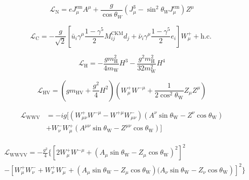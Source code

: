 \begin{equation}\label{eq:1-3}
    \mathcal{L}_{\mathrm{N}}=e J_{\mu}^{\mathrm{em}} A^{\mu}+\frac{g}{\cos \theta_{W}}\left(J_{\mu}^{3}-\sin ^{2} \theta_{W} J_{\mu}^{\mathrm{em}}\right) Z^{\mu}
\end{equation}

\begin{equation}\label{eq:1-4}
    \mathcal{L}_{\mathrm{C}}=-\frac{g}{\sqrt{2}}\left[\bar{u}_{i} \gamma^{\mu} \frac{1-\gamma^{5}}{2} M_{i j}^{\mathrm{CKM}} d_{j}+\bar{\nu}_{i} \gamma^{\mu} \frac{1-\gamma^{5}}{2} e_{i}\right] W_{\mu}^{+}+\text {h.c. }
\end{equation}

\begin{equation}\label{eq:1-5}
    \mathcal{L}_{\mathrm{H}}=-\frac{g m_{\mathrm{H}}^{2}}{4 m_{\mathrm{W}}} H^{3}-\frac{g^{2} m_{\mathrm{H}}^{2}}{32 m_{\mathrm{W}}^{2}} H^{4}
\end{equation}

\begin{equation}\label{eq:1-6}
    \mathcal{L}_{\mathrm{HV}}=\left(g m_{\mathrm{HV}}+\frac{g^{2}}{4} H^{2}\right)\left(W_{\mu}^{+} W^{-\mu}+\frac{1}{2 \cos ^{2} \theta_{\mathrm{W}}} Z_{\mu} Z^{\mu}\right)
\end{equation}

\begin{equation}\label{eq:1-7}
    \begin{aligned}
        \mathcal{L}_{\mathrm{WWV}} & =-i g[\left(W_{\mu \nu}^{+} W^{-\mu}-W^{+\mu} W_{\mu \nu}^{-}\right)\left(A^{\nu} \sin \theta_{\mathrm{W}}-Z^{\nu} \cos \theta_{\mathrm{W}}\right) \\
        &+W_{\nu}^{-} W_{\mu}^{+}\left(A^{\mu \nu} \sin \theta_{\mathrm{W}}-Z^{\mu \nu} \cos \theta_{\mathrm{W}}\right)]
    \end{aligned}
\end{equation}

\begin{equation}\label{eq:1-8}
    \begin{aligned}
    & \mathcal{L}_{\mathrm{WWVV}} =-\frac{g^{2}}{4}\{ {\left[2 W_{\mu}^{+} W^{-\mu}+\left(A_{\mu} \sin \theta_{\mathrm{W}}-Z_{\mu} \cos \theta_{\mathrm{W}}\right)^{2}\right]^{2} } \\
    & \left.-\left[W_{\mu}^{+} W_{\nu}^{-}+W_{\nu}^{+} W_{\mu}^{-}+\left(A_{\mu} \sin \theta_{\mathrm{W}}-Z_{\mu} \cos \theta_{\mathrm{W}}\right)(A_{\nu} \sin \theta_{\mathrm{W}}-Z_{\nu} \cos \theta_{\mathrm{W}}\right)\right]^{2} \}
\end{aligned}
\end{equation}

